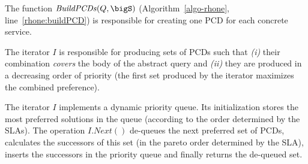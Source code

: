 The function $\mathit{BuildPCDs}(Q, \bigS)$ (Algorithm~\ref{algo-rhone}, line~\ref{rhone:buildPCD}) is responsible for creating one PCD for each concrete service.

The iterator $I$ is responsible for producing sets of PCDs such that \textit{(i)} their combination \textit{covers} the body of the abstract query and \textit{(ii)} they are produced in a decreasing order of priority (the first set produced by the iterator maximizes the combined preference).

The iterator $I$ implements a dynamic priority queue. 
Its initialization stores the most preferred solutions in the queue (according to the order determined by the SLAs).
The operation $I.\mathit{Next}()$ de-queues the next preferred set of PCDs, calculates the successors of this set (in the pareto order determined by the SLA), inserts the successors in the priority queue and finally returns the de-queued set.